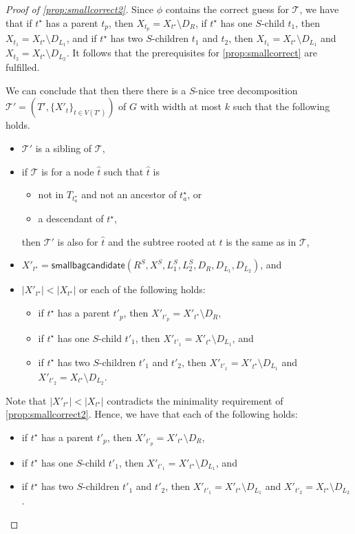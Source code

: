 \documentclass[a4paper,UKenglish,cleveref, autoref, thm-restate, numberwithinsect]{lipics-v2021}
\newcommand{\smallbagc}{\mathsf{smallbagcandidate}}
\newcommand{\slim}{\text{slim}\xspace}
\newcommand{\topheavy}{\text{top-heavy}\xspace}
\begin{document}
\begin{proof}[Proof of \cref{prop:smallcorrect2}]




Since $\phi$ contains the correct guess for $\mathcal{T}$, we have that if $t^\star$ has a parent $t_p$, then $X_{t_p}=X_{t^\star}\setminus D_R$, if $t^\star$ has one $S$-child $t_1$, then $X_{t_1}=X_{t^\star}\setminus D_{L_1}$, and if $t^\star$ has two $S$-children $t_1$ and $t_2$, then $X_{t_1}=X_{t^\star}\setminus D_{L_1}$ and $X_{t_2}=X_{t^\star}\setminus D_{L_2}$.
It follows that the prerequisites for \cref{prop:smallcorrect} are fulfilled. 


We can conclude that then there there is a \slim $S$-nice tree decomposition $\mathcal{T}'=(T',\{X'_t\}_{t\in V(T')})$ of $G$ with width at most $k$ 
such that the following holds.
\begin{itemize}
\item $\mathcal{T}'$ is a sibling of $\mathcal{T}$,  
\item if $\mathcal{T}$ is \topheavy for a node $\hat{t}$ such that $\hat{t}$ is
\begin{itemize}
    \item not in $T_{t^\star_a}$ and not an ancestor of $t^\star_a$, or
    \item a descendant of $t^\star$,
\end{itemize}
then $\mathcal{T}'$ is also \topheavy for $\hat{t}$ and the subtree rooted at $\hat{t}$ is the same as in $\mathcal{T}$, 
\item $X'_{t^{\star}}=\smallbagc(R^S,X^S,L_1^S,L_2^S,D_R,D_{L_1},D_{L_2})$, and 
\item $|X'_{t^{\star}}|<|X_{t^{\star}}|$ or each of the following holds:
\begin{itemize}
    \item if $t^{\star}$ has a parent $t'_p$, then $X'_{t'_p}=X'_{t^{\star}}\setminus D_R$, 
    \item if $t^{\star}$ has one $S$-child $t'_1$, then $X'_{t'_1}=X'_{t^{\star}}\setminus D_{L_1}$, and 
    \item if $t^{\star}$ has two $S$-children $t'_1$ and $t'_2$, then $X'_{t'_1}=X'_{t^{\star}}\setminus D_{L_1}$ and $X'_{t'_2}=X_{t^{\star}}\setminus D_{L_2}$.
\end{itemize}
\end{itemize}
Note that $|X'_{t^{\star}}|<|X_{t^{\star}}|$ contradicts the minimality requirement of \cref{prop:smallcorrect2}. Hence, we have that each of the following holds:
\begin{itemize}
    \item if $t^{\star}$ has a parent $t'_p$, then $X'_{t'_p}=X'_{t^{\star}}\setminus D_R$, 
    \item if $t^{\star}$ has one $S$-child $t'_1$, then $X'_{t'_1}=X'_{t^{\star}}\setminus D_{L_1}$, and 
    \item if $t^{\star}$ has two $S$-children $t'_1$ and $t'_2$, then $X'_{t'_1}=X'_{t^{\star}}\setminus D_{L_1}$ and $X'_{t'_2}=X_{t^{\star}}\setminus D_{L_2}$.
\end{itemize}



\end{proof}
\end{document}
